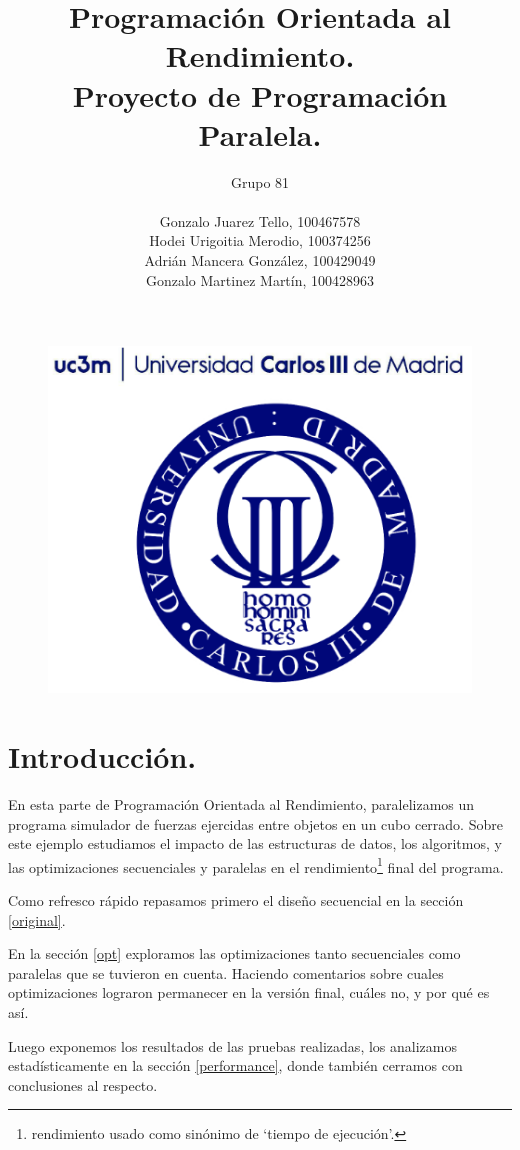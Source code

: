\documentclass{article}
\title{Programación Orientada al Rendimiento.\\Proyecto de Programación Paralela.}
\author{Grupo 81\\ \\
	Gonzalo Juarez Tello, 100467578\\
	Hodei Urigoitia Merodio, 100374256\\
	Adrián Mancera González, 100429049\\
	Gonzalo Martinez Martín, 100428963
}
\date{}
\begin{document}
\begin{figure}
	\includegraphics[width=\linewidth,height=0.7\textwidth]{resources/logo_uc3m.png}
\end{figure}
\maketitle
\newpage

\tableofcontents
\newpage

\section{Introducción.\label{intro}}
En esta parte de Programación Orientada al Rendimiento, paralelizamos
un programa simulador de fuerzas ejercidas entre objetos
en un cubo cerrado. Sobre este ejemplo estudiamos el impacto de las
estructuras de datos, los algoritmos, y las optimizaciones secuenciales
y paralelas en el rendimiento\footnote{rendimiento usado como sinónimo de
`tiempo de ejecución'.} final del programa.

Como refresco rápido repasamos primero el diseño secuencial en la sección \ref{original}.


En la sección \ref{opt} exploramos las optimizaciones tanto secuenciales como
paralelas que se tuvieron en cuenta. Haciendo comentarios
sobre cuales optimizaciones lograron permanecer en la versión final, cuáles no, y por qué es así.


Luego exponemos los resultados de las pruebas realizadas, los analizamos estadísticamente en la sección \ref{performance},
donde también cerramos con conclusiones al respecto.
\end{document}
